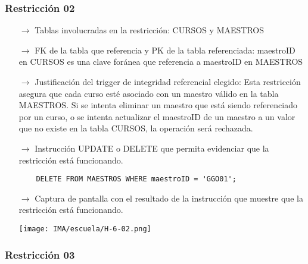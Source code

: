 \subsubsection*{Restricción 02}

\begin{itemize}
  \item[$\rightarrow$] Tablas involucradas en la restricción: CURSOS y MAESTROS
  \item[$\rightarrow$] FK de la tabla que referencia y PK de la tabla referenciada: maestroID en CURSOS es una clave foránea que referencia a maestroID en MAESTROS
  \item[$\rightarrow$] Justificación del trigger de integridad referencial elegido: Esta restricción asegura que cada curso esté asociado con un maestro válido en la tabla MAESTROS. Si se intenta eliminar un maestro que está siendo referenciado por un curso, o se intenta actualizar el maestroID de un maestro a un valor que no existe en la tabla CURSOS, la operación será rechazada.
  \item[$\rightarrow$] Instrucción UPDATE o DELETE que permita evidenciar que la restricción está funcionando.
  \begin{verbatim}
    DELETE FROM MAESTROS WHERE maestroID = 'GGO01';
  \end{verbatim}
  \item[$\rightarrow$] Captura de pantalla con el resultado de la instrucción que muestre que la restricción está funcionando.
  \begin{center}
    \texttt{[image: IMA/escuela/H-6-02.png]}
  \end{center}
\end{itemize}

\subsubsection*{Restricción 03}

